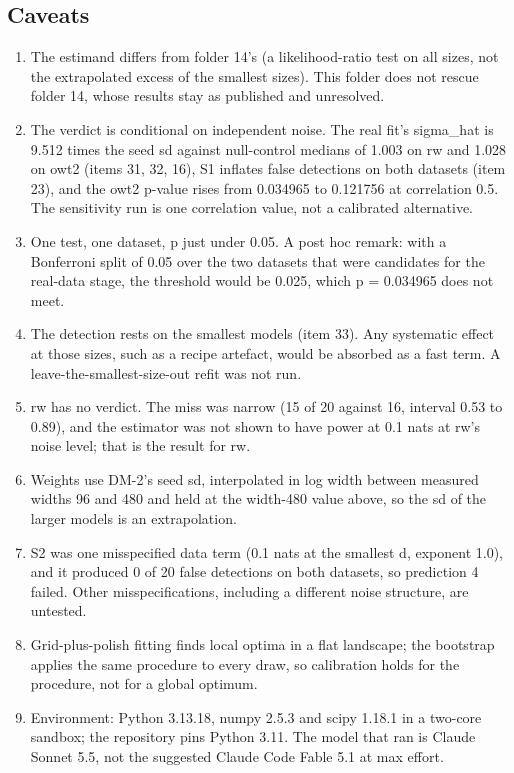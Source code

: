 \subsection*{Caveats}

\begin{enumerate}
  \item The estimand differs from folder 14's (a likelihood-ratio test on all sizes, not the extrapolated excess of the smallest sizes). This folder does not rescue folder 14, whose results stay as published and unresolved.
  \item The verdict is conditional on independent noise. The real fit's sigma\_hat is 9.512 times the seed sd against null-control medians of 1.003 on rw and 1.028 on owt2 (items 31, 32, 16), S1 inflates false detections on both datasets (item 23), and the owt2 p-value rises from 0.034965 to 0.121756 at correlation 0.5. The sensitivity run is one correlation value, not a calibrated alternative.
  \item One test, one dataset, p just under 0.05. A post hoc remark: with a Bonferroni split of 0.05 over the two datasets that were candidates for the real-data stage, the threshold would be 0.025, which p = 0.034965 does not meet.
  \item The detection rests on the smallest models (item 33). Any systematic effect at those sizes, such as a recipe artefact, would be absorbed as a fast term. A leave-the-smallest-size-out refit was not run.
  \item rw has no verdict. The miss was narrow (15 of 20 against 16, interval 0.53 to 0.89), and the estimator was not shown to have power at 0.1 nats at rw's noise level; that is the result for rw.
  \item Weights use DM-2's seed sd, interpolated in log width between measured widths 96 and 480 and held at the width-480 value above, so the sd of the larger models is an extrapolation.
  \item S2 was one misspecified data term (0.1 nats at the smallest d, exponent 1.0), and it produced 0 of 20 false detections on both datasets, so prediction 4 failed. Other misspecifications, including a different noise structure, are untested.
  \item Grid-plus-polish fitting finds local optima in a flat landscape; the bootstrap applies the same procedure to every draw, so calibration holds for the procedure, not for a global optimum.
  \item Environment: Python 3.13.18, numpy 2.5.3 and scipy 1.18.1 in a two-core sandbox; the repository pins Python 3.11. The model that ran is Claude Sonnet 5.5, not the suggested Claude Code Fable 5.1 at max effort.

\end{enumerate}

